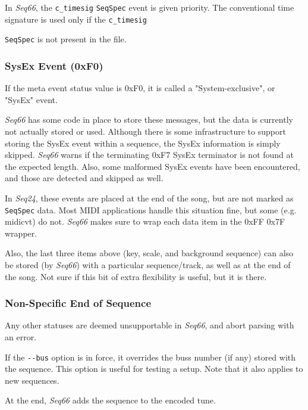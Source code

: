    In \textsl{Seq66},
   the \texttt{c\_timesig}
   \texttt{SeqSpec} event is given priority.  The
   conventional time signature is used only if the \texttt{c\_timesig}
  
  \texttt{SeqSpec} is not present in the file.

\subsubsection{SysEx Event (0xF0)}
\label{subsubsec:midi_format_meta_sysex_event}

   If the meta event status value is 0xF0, it is called a "System-exclusive",
   or "SysEx" event.

   \textsl{Seq66} has some code in place to store these messages, but the
   data is currently not actually stored or used.  Although there is some
   infrastructure to support storing the SysEx event within a sequence, the
   SysEx information is simply skipped.  \textsl{Seq66} warns if the
   terminating 0xF7 SysEx terminator is not found at the expected length.
   Also, some malformed SysEx events have been encountered, and those are
   detected and skipped as well.

   In \textsl{Seq24}, these events are placed at the end of the song, but are
   not marked as
   \texttt{SeqSpec} data.  Most MIDI applications handle this situation
   fine, but some (e.g. midicvt) do not.  \textsl{Seq66} makes
   sure to wrap each data item in the 0xFF 0x7F wrapper.

   Also, the last three items above (key, scale, and background sequence) can
   also be stored (by \textsl{Seq66}) with a particular sequence/track,
   as well as at the end of the song.  Not sure if this bit of extra
   flexibility is useful, but it is there.

\subsubsection{Non-Specific End of Sequence}
\label{subsubsec:midi_format_meta_sequence_ends}

   Any other statuses are deemed unsupportable in \textsl{Seq66}, and
   abort parsing with an error.

   If the \texttt{-{}-bus} option is in force, it overrides the buss number (if any)
   stored with the sequence.  This option is useful for testing a setup.
   Note that it also applies to new sequences.

   At the end, \textsl{Seq66} adds the sequence to the encoded tune.

